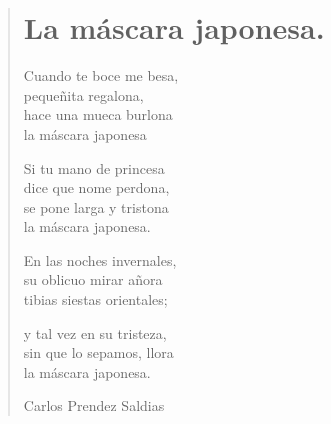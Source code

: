 \documentclass[12pt, twoside]{book}
\begin{document}
\begin{verse}
\begin{center}
\section{La máscara japonesa.}
\end{center}

Cuando te boce me besa,\\
pequeñita regalona,\\
hace una mueca burlona\\
la máscara japonesa\newline

Si tu mano de princesa\\
dice que nome perdona,\\
se pone larga y tristona\\
la máscara japonesa.\newline

En las noches invernales,\\
su oblicuo mirar añora\\
tibias siestas orientales;\newline

y tal vez en su tristeza,\\
sin que lo sepamos, llora\\
la máscara japonesa.\newline

Carlos Prendez Saldias
\end{verse}
\newpage
\end{document}
